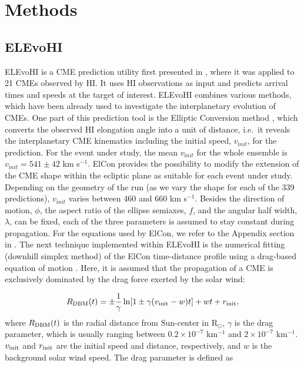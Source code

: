 \documentclass[draft]{agujournal}
\begin{document}
\section{Methods}

\subsection{ELEvoHI}
\label{sec:ELEvoHI}

ELEvoHI is a CME prediction utility first presented in \cite{rol16}, where it was applied to 21 CMEs observed by HI. It uses HI observations as input and predicts arrival times and speeds at the target of interest. ELEvoHI combines various methods, which have been already used to investigate the interplanetary evolution of CMEs. One part of this prediction tool is the Elliptic Conversion method \citep[ElCon;][]{rol16}, which converts the observed HI elongation angle into a unit of distance, i.e.\ it reveals the interplanetary CME kinematics \citep[e.g.][]{bar17} including the initial speed, $v_{\mathrm init}$, for the prediction. For the event under study, the mean $v_{\mathrm init}$ for the whole ensemble is $v_{\mathrm init}=541 \pm 42$ km s$^{-1}$. ElCon provides the possibility to modify the extension of the CME shape within the ecliptic plane as suitable for each event under study. Depending on the geometry of the run (as we vary the shape for each of the 339 predictions), $v_{\mathrm init}$ varies between 460 and 660 km s$^{-1}$. Besides the direction of motion, $\phi$, the aspect ratio of the ellipse semiaxes, $f$, and the angular half width, $\lambda$, can be fixed, each of the three parameters is assumed to stay constant during propagation. For the equations used by ElCon, we refer to the Appendix section in \citet{rol16}. The next technique implemented within ELEvoHI is the numerical fitting (downhill simplex method) of the ElCon time-distance profile using a drag-based equation of motion \citep[][]{vrs13}. Here, it is assumed that the propagation of a CME is exclusively dominated by the drag force exerted by the solar wind: 

\begin{equation}
R_{\rm DBM}(t) = \pm \frac{1}{\gamma} \ln [1 \pm \gamma (v_{\rm init}-w) t] + w t + r_{\rm init},
\label{eq:dbm}
\end{equation}
where $R_{\rm DBM}(t)$ is the radial distance from Sun-center in R$_\odot$, $\gamma$ is the drag parameter, which is usually ranging between $0.2\times10^{-7}$ km$^{-1}$ and $2\times10^{-7}$ km$^{-1}$. $v_{\rm init}$ and $r_{\rm init}$ are the initial speed and distance, respectively, and $w$ is the background solar wind speed. The drag parameter is defined as
\end{document}
